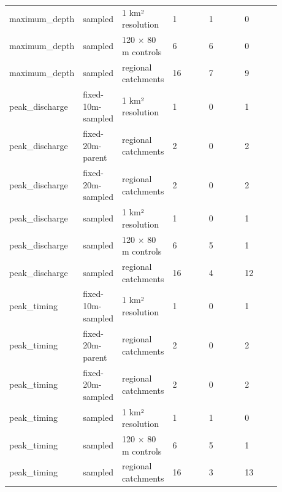 \begin{longtable}{p{0.1467\linewidth}p{0.1467\linewidth}p{0.1467\linewidth}p{0.1467\linewidth}p{0.1467\linewidth}p{0.1467\linewidth}}
maximum\_depth & sampled & 1 km² resolution & 1 & 1 & 0 \\
maximum\_depth & sampled & 120 × 80 m controls & 6 & 6 & 0 \\
maximum\_depth & sampled & regional catchments & 16 & 7 & 9 \\
peak\_discharge & fixed-10m-sampled & 1 km² resolution & 1 & 0 & 1 \\
peak\_discharge & fixed-20m-parent & regional catchments & 2 & 0 & 2 \\
peak\_discharge & fixed-20m-sampled & regional catchments & 2 & 0 & 2 \\
peak\_discharge & sampled & 1 km² resolution & 1 & 0 & 1 \\
peak\_discharge & sampled & 120 × 80 m controls & 6 & 5 & 1 \\
peak\_discharge & sampled & regional catchments & 16 & 4 & 12 \\
peak\_timing & fixed-10m-sampled & 1 km² resolution & 1 & 0 & 1 \\
peak\_timing & fixed-20m-parent & regional catchments & 2 & 0 & 2 \\
peak\_timing & fixed-20m-sampled & regional catchments & 2 & 0 & 2 \\
peak\_timing & sampled & 1 km² resolution & 1 & 1 & 0 \\
peak\_timing & sampled & 120 × 80 m controls & 6 & 5 & 1 \\
peak\_timing & sampled & regional catchments & 16 & 3 & 13 \\
\end{longtable}
\endgroup

